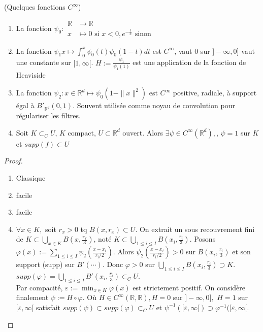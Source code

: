 \begin{lemme}
    (Quelques fonctions $C^\infty $)
    \begin{enumerate}
        \item La fonction $\psi_0:
            \begin{aligned}
                \mathbb{R} &\to \mathbb{R} \\
                x&\mapsto 0 \text{ si } x<0, e^{-\frac{1}{x}} \text{ sinon}
            \end{aligned}$
        \item La fonction $\psi_1x\mapsto \int_0^x\psi_0(t)\psi_0(1-t)dt$ est $C^\infty $, vaut 0 sur $]-\infty ,0]$  vaut une constante sur $[1,\infty [$. $H:=\frac{\psi_1}{\psi_1(1)} $  est une application de la fonction de Heaviside
        \item La fonction $\psi_2:x\in \mathbb{R} ^d\mapsto \psi_0(1-\|x\|^2)$ est $C^\infty $  positive, radiale, à support égal à $B'_{\mathbb{R} ^d}(0,1)$. Souvent utilisée comme noyau de convolution pour régulariser les filtres.
        \item Soit $K\subset_CU$, $K$ compact, $U\subset \mathbb{R} ^d$ ouvert. Alors $\exists \psi\in C^\infty (\mathbb{R} ^d),$, $\psi=1$ sur $K$et $supp(f)\subset U$
    \end{enumerate}
\end{lemme}
\begin{proof}
    \begin{enumerate}
        \item Classique
        \item facile
        \item facile
        \item $\forall x\in K, $  soit $r_x>0$ tq $B(x,r_x)\subset U$. On extrait un sous recouvrement fini de $K\subset \bigcup\limits_{x\in K} B(x,\frac{r_x}{3})$, noté $K\subset \bigcup\limits_{1\le i\le I} B(x_i, \frac{r_i}{3})$. Posons $\varphi (x):=\sum\limits_{1\le i\le I}^{} \psi_2(\frac{x-x_i}{r_i /2})$. Alors $\psi_2(\frac{x-x_i}{r_i /2})>0$ sur $B(x_i,\frac{r_i}{3})$ et son support (supp) sur $B'(\cdots)$. Donc $\varphi >0$  sur $\bigcup\limits_{1\le i\le I} B(x_i,\frac{r_i}{3})\supset K$. $supp(\varphi )=\bigcup\limits_{1\le i\le I} B'(x_i,\frac{r_i}{3})\subset _CU$.\\
            Par compacité, $\varepsilon :=\min_{x\in K}\varphi (x)$  est strictement positif. On considère finalement $\psi:=H\circ \varphi $. Où $H\in C^\infty (\mathbb{R} ,\mathbb{R} ), H=0$ sur $]-\infty ,0],$ $H=1$ sur $[\varepsilon ,\infty [$ satisfait $supp(\psi)\subset supp(\varphi )\subset _CU$ et $\psi^{-1}([\varepsilon ,\infty [)\supset \varphi ^{-1} ([\varepsilon ,\infty [$.
    \end{enumerate}
\end{proof}

